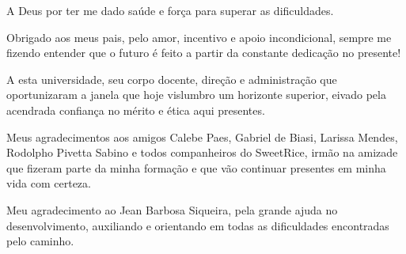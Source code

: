 \documentclass[
	12pt,				%
	openright,			%
	twoside,			%
	a4paper,			%
	chapter=TITLE,		%
	english,			%
	brazil				%
	]{abntex2}
\begin{document}









\begin{agradecimentos}

A Deus por ter me dado saúde e força para superar as dificuldades.

Obrigado aos meus pais, pelo amor, incentivo e apoio incondicional, sempre me fizendo entender que o futuro é feito a partir da constante dedicação no presente!

A esta universidade, seu corpo docente, direção e administração que oportunizaram a janela que hoje vislumbro um horizonte superior, eivado pela acendrada confiança no mérito e ética aqui presentes.


Meus agradecimentos aos amigos Calebe Paes, Gabriel de Biasi, Larissa Mendes, Rodolpho Pivetta Sabino e todos companheiros do SweetRice, irmão na amizade que fizeram parte da minha formação e que vão continuar presentes em minha vida com certeza.

Meu agradecimento ao Jean Barbosa Siqueira, pela grande ajuda no desenvolvimento, auxiliando e orientando em todas as dificuldades encontradas pelo caminho. 


\end{agradecimentos}
\end{document}
